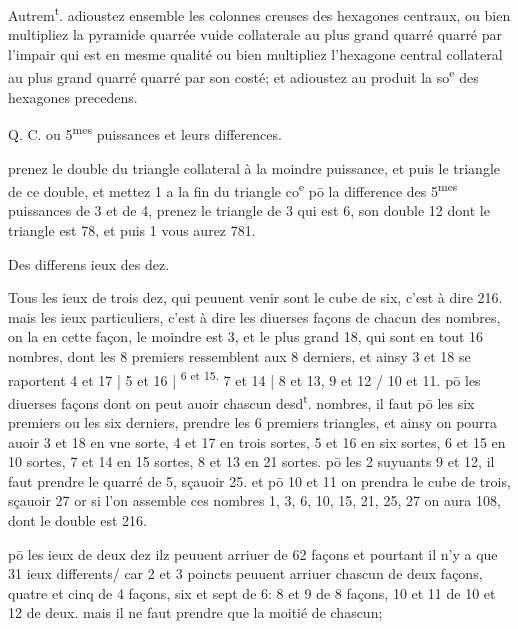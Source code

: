 \documentclass[11pt,a4paper]{article}
\begin{document}
Autrem\textsuperscript{t}. adioustez ensemble les colonnes creuses des hexagones centraux, ou bien multipliez la pyramide quarrée vuide collaterale au plus grand quarré quarré par l'impair qui est en mesme qualité ou bien multipliez l'hexagone central collateral au plus grand quarré quarré par son costé; et adioustez au produit la so\textsuperscript{e} des hexagones precedens.

Q. C. ou 5\textsuperscript{mes} puissances et leurs differences.

prenez le double du triangle collateral à la moindre puissance, et puis le triangle de ce double, et mettez 1 a la fin du triangle co\textsuperscript{e} pō la difference des 5\textsuperscript{mes} puissances de 3 et de 4, prenez le triangle de 3 qui est 6, son double 12 dont le triangle est 78, et puis 1 vous aurez 781.

Des differens ieux des dez.

Tous les ieux de trois dez, qui peuuent venir sont le cube de six, c'est à dire 216. mais les ieux particuliers, c'est à dire les diuerses façons de chacun des nombres, on la en cette façon, le moindre est 3, et le plus grand 18, qui sont en tout 16 nombres, dont les 8 premiers ressemblent aux 8 derniers, et ainsy 3 et 18 se raportent 4 et 17 | 5 et 16 | \textsuperscript{6 et 15.} 7 et 14 | 8 et 13, 9 et 12 / 10 et 11. pō les diuerses façons dont on peut auoir chascun desd\textsuperscript{t}. nombres, il faut pō les six premiers ou les six derniers, prendre les 6 premiers triangles, et ainsy on pourra auoir 3 et 18 en vne sorte, 4 et 17 en trois sortes, 5 et 16 en six sortes, 6 et 15 en 10 sortes, 7 et 14 en 15 sortes, 8 et 13 en 21 sortes. pō les 2 suyuants 9 et 12, il faut prendre le quarré de 5, sçauoir 25. et pō 10 et 11 on prendra le cube de trois, sçauoir 27 or si l'on assemble ces nombres 1, 3, 6, 10, 15, 21, 25, 27 on aura 108, dont le double est 216.

pō les ieux de deux dez ilz peuuent arriuer de 62 façons et pourtant il n'y a que 31 \struck{\ill{}} ieux differents/ car 2 et 3 poincts peuuent arriuer chascun de deux façons, quatre et cinq de 4 façons, six et sept de 6: 8 et 9 de 8 façons, 10 et 11 de 10 et 12 de deux. mais il ne faut prendre que la moitié de chascun;
\end{document}

